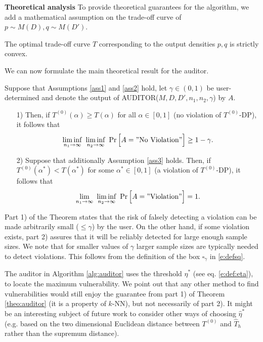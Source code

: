 \noindent\textbf{Theoretical analysis} To provide theoretical guarantees for the algorithm, we add a mathematical assumption on the trade-off curve of $p \sim M(D), q \sim M(D')$.

\begin{ass} \label{ass3}
    The optimal trade-off curve $T$ corresponding to the output densities $p,q$ is strictly convex.
\end{ass}
We can now formulate the main theoretical result for the auditor. 

\begin{theo} \label{theo:auditor}
    Suppose that Assumptions \ref{ass1} and \ref{ass2} hold, let $\gamma \in (0,1)$ be user-determined and denote the output of AUDITOR($M, D, D', n_1, n_2, \gamma$)  by $A$.
    \begin{itemize}
        \item[1)] Then, if $T^{(0)}(\alpha) \ge T(\alpha)$ for all $\alpha \in [0,1]$ (no violation of $T^{(0)}$-DP), it follows that 
    \[
     \liminf_{n_1 \to \infty}\,\,\liminf_{n_2 \to \infty} \,\,\Pr\Big[ A = "\textnormal{No Violation}"\Big]\ge 1-\gamma.
    \]
 
    \item[2)] Suppose that additionally Assumption \ref{ass3} holds. Then, if $T^{(0)}(\alpha^*) < T(\alpha^*)$ for some $\alpha^* \in [0,1]$ (a violation of $T^{(0)}$-DP), it follows that   
    \[
    \lim_{n_1 \to \infty} \,\,\liminf_{n_2 \to \infty} \,\,\Pr\Big[ A = "\textnormal{Violation}"\Big]= 1.
    \]
    \end{itemize}
\end{theo}
Part 1) of the Theorem states that the risk of falsely detecting a violation can be made arbitrarily small ($\le \gamma$) by the user. On the other hand, if some violation exists, part 2) assures that it will be reliably detected for large enough sample sizes. We note that for smaller values of $\gamma$ larger sample sizes are typically needed to detect violations. This follows from the definition of the box $\square_\gamma$ in \eqref{e:defsq}.
\begin{rem}
\textnormal{
The auditor in Algorithm \ref{alg:auditor} uses the threshold $\hat \eta^*$ (see eq.
\ref{e:def:eta}), to locate the maximum vulnerability. We point out that any other method to find vulnerabilities would still enjoy the guarantee from part 1) of Theorem \ref{theo:auditor} (it is a property of $k$-NN), but not necessarily of part 2). It might be an interesting subject of future work to consider other ways of choosing $\hat \eta^*$ (e.g. based on the two dimensional Euclidean distance between $T^{(0)}$ and $\hat T_h$ rather than the supremum distance).
}
\end{rem}